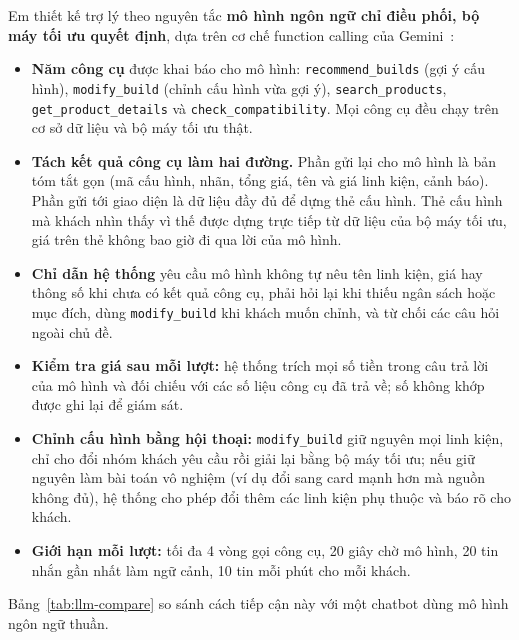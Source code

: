 Em thiết kế trợ lý theo nguyên tắc \textbf{mô hình ngôn ngữ chỉ điều phối, bộ máy tối ưu quyết định}, dựa trên cơ chế function calling của Gemini~\cite{gemini-fc}:
\begin{itemize}
  \item \textbf{Năm công cụ} được khai báo cho mô hình: \texttt{recommend\_builds} (gợi ý cấu hình), \texttt{modify\_build} (chỉnh cấu hình vừa gợi ý), \texttt{search\_products}, \texttt{get\_product\_details} và \texttt{check\_compatibility}. Mọi công cụ đều chạy trên cơ sở dữ liệu và bộ máy tối ưu thật.
  \item \textbf{Tách kết quả công cụ làm hai đường.} Phần gửi lại cho mô hình là bản tóm tắt gọn (mã cấu hình, nhãn, tổng giá, tên và giá linh kiện, cảnh báo). Phần gửi tới giao diện là dữ liệu đầy đủ để dựng thẻ cấu hình. Thẻ cấu hình mà khách nhìn thấy vì thế được dựng trực tiếp từ dữ liệu của bộ máy tối ưu, giá trên thẻ không bao giờ đi qua lời của mô hình.
  \item \textbf{Chỉ dẫn hệ thống} yêu cầu mô hình không tự nêu tên linh kiện, giá hay thông số khi chưa có kết quả công cụ, phải hỏi lại khi thiếu ngân sách hoặc mục đích, dùng \texttt{modify\_build} khi khách muốn chỉnh, và từ chối các câu hỏi ngoài chủ đề.
  \item \textbf{Kiểm tra giá sau mỗi lượt:} hệ thống trích mọi số tiền trong câu trả lời của mô hình và đối chiếu với các số liệu công cụ đã trả về; số không khớp được ghi lại để giám sát.
  \item \textbf{Chỉnh cấu hình bằng hội thoại:} \texttt{modify\_build} giữ nguyên mọi linh kiện, chỉ cho đổi nhóm khách yêu cầu rồi giải lại bằng bộ máy tối ưu; nếu giữ nguyên làm bài toán vô nghiệm (ví dụ đổi sang card mạnh hơn mà nguồn không đủ), hệ thống cho phép đổi thêm các linh kiện phụ thuộc và báo rõ cho khách.
  \item \textbf{Giới hạn mỗi lượt:} tối đa 4 vòng gọi công cụ, 20 giây chờ mô hình, 20 tin nhắn gần nhất làm ngữ cảnh, 10 tin mỗi phút cho mỗi khách.
\end{itemize}

Bảng~\ref{tab:llm-compare} so sánh cách tiếp cận này với một chatbot dùng mô hình ngôn ngữ thuần.

